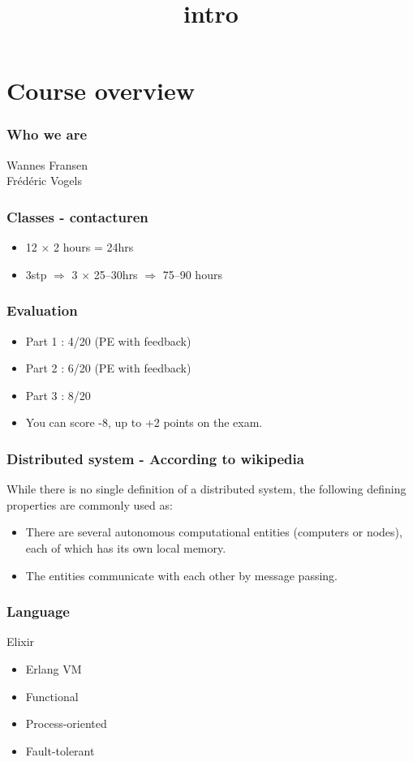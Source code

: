\documentclass{ucll-slides}
\title{intro}
\begin{document}
\maketitle

\section{Course overview}

\begin{frame}
    \frametitle{Who we are}
    \begin{center} \large
        Wannes Fransen \\[4mm]
        Frédéric Vogels
    \end{center}
\end{frame}

\begin{frame}
    \frametitle{Classes - contacturen}
    \begin{itemize}
        \item 12 $\times$ 2 hours = 24hrs 
        \item 3stp $\Rightarrow$ 3 $\times$ 25--30hrs $\Rightarrow$ 75--90 hours 
    \end{itemize}
\end{frame}

\begin{frame}
    \frametitle{Evaluation}
    \begin{itemize}
        \item Part 1 : 4/20 (PE with feedback)
        \item Part 2 : 6/20 (PE with feedback)
        \item Part 3 : 8/20 
    \end{itemize}
    \vskip4mm
    \begin{itemize}
        \item You can score -8, up to +2 points on the exam.
    \end{itemize}
\end{frame}

\begin{frame}
    \frametitle{Distributed system - According to wikipedia}

    While there is no single definition of a distributed system, the following defining properties are commonly used as:
    \begin{itemize}
        \item There are several autonomous computational entities (computers or nodes), each of which has its own local memory.
        \item The entities communicate with each other by message passing.
    \end{itemize}
    
\end{frame}

\begin{frame}
    \frametitle{Language}
    Elixir 

    \begin{itemize}
        \item Erlang VM
        \item Functional
        \item Process-oriented
        \item Fault-tolerant
    \end{itemize}
\end{frame}
\end{document}
